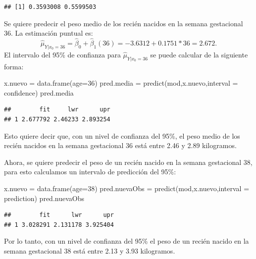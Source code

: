 \documentclass[
]{article}
\newenvironment{Shaded}{\begin{snugshade}}{\end{snugshade}}
\newcommand{\AttributeTok}[1]{\textcolor[rgb]{0.77,0.63,0.00}{#1}}
\newcommand{\DecValTok}[1]{\textcolor[rgb]{0.00,0.00,0.81}{#1}}
\newcommand{\FunctionTok}[1]{\textcolor[rgb]{0.00,0.00,0.00}{#1}}
\newcommand{\NormalTok}[1]{#1}
\newcommand{\OtherTok}[1]{\textcolor[rgb]{0.56,0.35,0.01}{#1}}
\newcommand{\StringTok}[1]{\textcolor[rgb]{0.31,0.60,0.02}{#1}}
\begin{document}
\begin{verbatim}
## [1] 0.3593008 0.5599503
\end{verbatim}

Se quiere predecir el peso medio de los recién nacidos en la semana gestacional 36. La estimación puntual es:
\[
\widehat{\mu}_{Y|x_{0}=36} = \widehat{\beta}_{0} + \widehat{\beta}_{1}(36) = -3.6312 + 0.1751*36 = 2.672.
\]
El intervalo del 95\% de confianza para \(\widehat{\mu}_{Y|x_{0}=36}\) se puede calcular de la siguiente forma:

\begin{Shaded}
\begin{Highlighting}[]
\NormalTok{x.nuevo }\OtherTok{=} \FunctionTok{data.frame}\NormalTok{(}\AttributeTok{age=}\DecValTok{36}\NormalTok{)}
\NormalTok{pred.media }\OtherTok{=} \FunctionTok{predict}\NormalTok{(mod,x.nuevo,}\AttributeTok{interval =} \StringTok{\textquotesingle{}confidence\textquotesingle{}}\NormalTok{)}
\NormalTok{pred.media}
\end{Highlighting}
\end{Shaded}

\begin{verbatim}
##        fit     lwr      upr
## 1 2.677792 2.46233 2.893254
\end{verbatim}

Esto quiere decir que, con un nivel de confianza del 95\%, el peso medio de los recién nacidos en la semana gestacional 36 está entre 2.46 y 2.89 kilogramos.

Ahora, se quiere predecir el peso de un recién nacido en la semana gestacional 38, para esto calculamos un intervalo de predicción del 95\%:

\begin{Shaded}
\begin{Highlighting}[]
\NormalTok{x.nuevo }\OtherTok{=} \FunctionTok{data.frame}\NormalTok{(}\AttributeTok{age=}\DecValTok{38}\NormalTok{)}
\NormalTok{pred.nuevaObs }\OtherTok{=} \FunctionTok{predict}\NormalTok{(mod,x.nuevo,}\AttributeTok{interval =} \StringTok{\textquotesingle{}prediction\textquotesingle{}}\NormalTok{)}
\NormalTok{pred.nuevaObs}
\end{Highlighting}
\end{Shaded}

\begin{verbatim}
##        fit      lwr      upr
## 1 3.028291 2.131178 3.925404
\end{verbatim}

Por lo tanto, con un nivel de confianza del 95\% el peso de un recién nacido en la semana gestacional 38 está entre 2.13 y 3.93 kilogramos.
\end{document}
